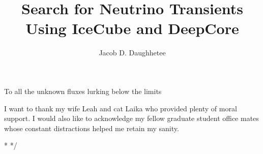 \documentclass{gatech-thesis}
\title{Search for Neutrino Transients Using IceCube and DeepCore}
\author{Jacob D. Daughhetee}
\begin{document}

\begin{preliminary}

\begin{dedication}
\null\vfil
{\large
\begin{center}
To all the unknown fluxes lurking below the limits
\end{center}}
\vfil\null
\end{dedication}

\begin{preface}


\end{preface}

\begin{acknowledgements}
I want to thank my wife Leah and cat Laika who provided plenty of moral support. I would also like to acknowledge my fellow graduate student office mates whose constant distractions helped me retain my sanity.
\end{acknowledgements}
\contents

\begin{summary}

\long{}
\/*
*/


\end{summary}
\end{preliminary}
\end{document}
